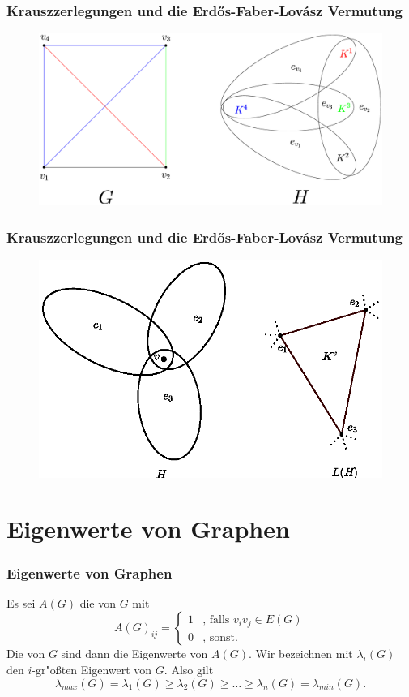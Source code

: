 \documentclass{beamer}
\begin{document}
\begin{frame}
  \frametitle{Krauszzerlegungen und die Erd\H os-Faber-Lov\'asz Vermutung}
\begin{figure}[h]
  \centering
  \includegraphics[width=\textwidth]{images/k4krausztohypergraph}
\end{figure}
\end{frame}
\begin{frame}
  \frametitle{Krauszzerlegungen und die Erd\H os-Faber-Lov\'asz Vermutung}
  \begin{figure}[h]
    \centering
    \includegraphics[width=\textwidth]{images/KvLinegraph.eps}
  \end{figure}
\end{frame}
\section{Eigenwerte von Graphen}
\begin{frame}[<+->]
  \frametitle{Eigenwerte von Graphen}
  Es sei $A(G)$ die  von $G$ mit 
  $$A(G)_{ij} = \begin{cases}
    1 & \text{, falls } v_iv_j \in E(G) \\
    0 & \text{, sonst.}
  \end{cases}$$
  \pause
  Die  von $G$ sind dann die Eigenwerte von $A(G)$. 
  \pause
  Wir bezeichnen mit $\lambda_{i}(G)$ den $i$-gr"o{\ss}ten Eigenwert von $G$. Also gilt 
  $$\lambda_{max}(G) = \lambda_{1}(G) \geq \lambda_{2}(G) \geq \dots \geq \lambda_{n}(G) = \lambda_{min}(G).$$
\end{frame}
\end{document}
